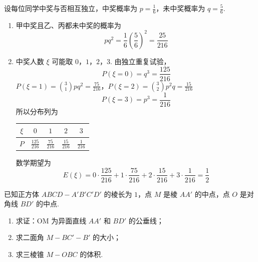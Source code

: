 \begin{solution}
设每位同学中奖与否相互独立，中奖概率为 \(p=\frac16\)，未中奖概率为 \(q=\frac56\).

\begin{enumerate}
\item 甲中奖且乙、丙都未中奖的概率为
\[
p q^2=\frac16\left(\frac56\right)^2=\frac{25}{216}
\]
\item 中奖人数 \(\xi\) 可能取 \(0\)，\(1\)，\(2\)，\(3\). 由独立重复试验，
\[
P(\xi=0)=q^3=\frac{125}{216}
\]
\(P(\xi=1)=\binom31pq^2=\frac{75}{216}\)，\(P(\xi=2)=\binom32p^2q=\frac{15}{216}\)
\[
P(\xi=3)=p^3=\frac1{216}
\]
所以分布列为

\begin{center}
\begin{tabular}{c|cccc}
\(\xi\) & \(0\) & \(1\) & \(2\) & \(3\) \\
\hline
\(P\) & \(\frac{125}{216}\) & \(\frac{75}{216}\) & \(\frac{15}{216}\) & \(\frac{1}{216}\)
\end{tabular}
\end{center}

数学期望为
\[
E(\xi)=0\cdot\frac{125}{216}+1\cdot\frac{75}{216}+2\cdot\frac{15}{216}+3\cdot\frac1{216}=\frac12
\]
\end{enumerate}
\end{solution}

\begin{problem}
已知正方体 \(ABCD - A'B'C'D'\) 的棱长为 \(1\)，点 \(M\) 是棱 \(AA'\) 的中点，点 \(O\) 是对角线 \(BD'\) 的中点.
\begin{enumerate}
\item 求证：OM 为异面直线 \(AA'\) 和 \(BD'\) 的公垂线；
\item 求二面角 \( M - BC' - B' \) 的大小；
\item 求三棱锥 \(M - OBC\) 的体积.
\end{enumerate}

\end{problem}

